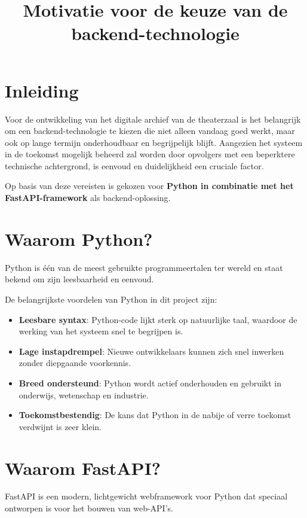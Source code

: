 \documentclass[11pt,a4paper]{article}
\title{Motivatie voor de keuze van de backend-technologie}
\author{ }
\date{ }
\begin{document}
\maketitle

\section{Inleiding}

Voor de ontwikkeling van het digitale archief van de theaterzaal is het belangrijk om een backend-technologie te kiezen die niet alleen vandaag goed werkt, maar ook op lange termijn onderhoudbaar en begrijpelijk blijft.  
Aangezien het systeem in de toekomst mogelijk beheerd zal worden door opvolgers met een beperktere technische achtergrond, is eenvoud en duidelijkheid een cruciale factor.

Op basis van deze vereisten is gekozen voor \textbf{Python in combinatie met het FastAPI-framework} als backend-oplossing.

\section{Waarom Python?}

Python is één van de meest gebruikte programmeertalen ter wereld en staat bekend om zijn leesbaarheid en eenvoud.

De belangrijkste voordelen van Python in dit project zijn:

\begin{itemize}
  \item \textbf{Leesbare syntax}: Python-code lijkt sterk op natuurlijke taal, waardoor de werking van het systeem snel te begrijpen is.
  \item \textbf{Lage instapdrempel}: Nieuwe ontwikkelaars kunnen zich snel inwerken zonder diepgaande voorkennis.
  \item \textbf{Breed ondersteund}: Python wordt actief onderhouden en gebruikt in onderwijs, wetenschap en industrie.
  \item \textbf{Toekomstbestendig}: De kans dat Python in de nabije of verre toekomst verdwijnt is zeer klein.
\end{itemize}


\section{Waarom FastAPI?}

FastAPI is een modern, lichtgewicht webframework voor Python dat speciaal ontworpen is voor het bouwen van web-API’s.
\end{document}
